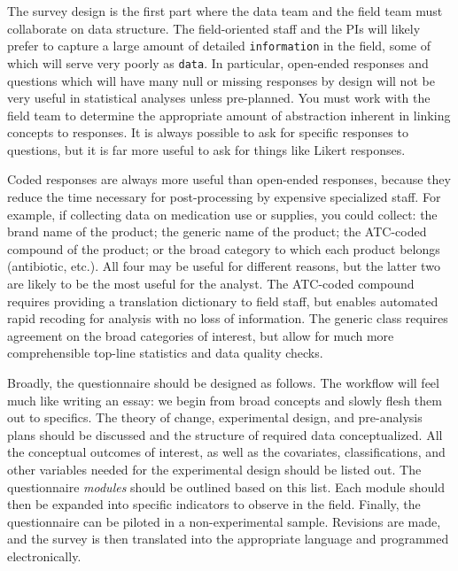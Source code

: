 The survey design is the first part where the data team
and the field team must collaborate on data structure.
The field-oriented staff and the PIs will likely prefer
to capture a large amount of detailed \texttt{information}
in the field, some of which will serve very poorly as \texttt{data}.
In particular, open-ended responses and questions which will have
many null or missing responses by design will not be very useful
in statistical analyses unless pre-planned.
You must work with the field team to determine the appropriate amount
of abstraction inherent in linking concepts to responses.
It is always possible to ask for specific responses to questions,
but it is far more useful to ask for things like Likert responses.

Coded responses are always more useful than open-ended responses,
because they reduce the time necessary for post-processing by
expensive specialized staff.
For example, if collecting data on medication use or supplies,
you could collect: the brand name of the product;
the generic name of the product;
the ATC-coded compound of the product;
or the broad category to which each product belongs (antibiotic, etc.).
All four may be useful for different reasons,
but the latter two are likely to be the most useful for the analyst.
The ATC-coded compound requires providing a translation dictionary
to field staff, but enables automated rapid recoding for analysis
with no loss of information.
The generic class requires agreement on the broad categories of interest,
but allow for much more comprehensible top-line statistics and data quality checks.

Broadly, the questionnaire should be designed as follows.
The workflow will feel much like writing an essay:
we begin from broad concepts and slowly flesh them out to specifics.
The theory of change, experimental design, and pre-analysis plans should be discussed
and the structure of required data conceptualized.
All the conceptual outcomes of interest, as well as the covariates, classifications,
and other variables needed for the experimental design should be listed out.
The questionnaire \textit{modules} should be outlined based on this list.
Each module should then be expanded into specific indicators to observe in the field.
Finally, the questionnaire can be piloted in a non-experimental sample.
Revisions are made, and the survey is then translated into the appropriate language and programmed electronically.

